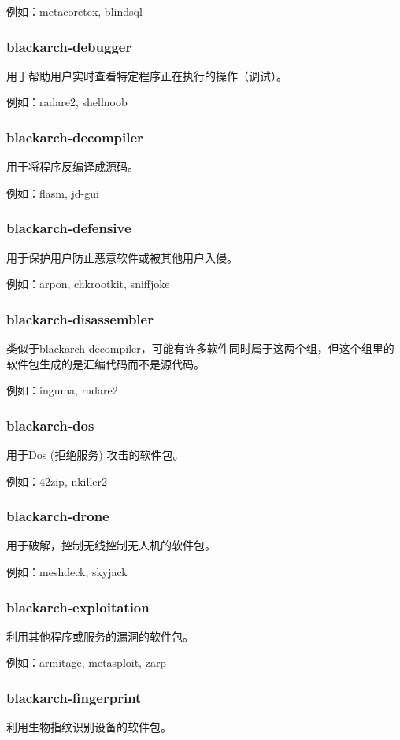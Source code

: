 \documentclass[a4paper, oneside, 11pt]{book}
\begin{document}
例如：metacoretex, blindsql

\subsubsection{blackarch-debugger}
用于帮助用户实时查看特定程序正在执行的操作（调试）。

例如：radare2, shellnoob

\subsubsection{blackarch-decompiler}
用于将程序反编译成源码。

例如：flasm, jd-gui

\subsubsection{blackarch-defensive}
用于保护用户防止恶意软件或被其他用户入侵。

例如：arpon, chkrootkit, sniffjoke

\subsubsection{blackarch-disassembler}
类似于blackarch-decompiler，可能有许多软件同时属于这两个组，但这个组里的软件包生成的是汇编代码而不是源代码。

例如：inguma, radare2

\subsubsection{blackarch-dos}
用于Dos (拒绝服务) 攻击的软件包。

例如：42zip, nkiller2

\subsubsection{blackarch-drone}
用于破解，控制无线控制无人机的软件包。

例如：meshdeck, skyjack

\subsubsection{blackarch-exploitation}
利用其他程序或服务的漏洞的软件包。

例如：armitage, metasploit, zarp

\subsubsection{blackarch-fingerprint}
利用生物指纹识别设备的软件包。
\end{document}
